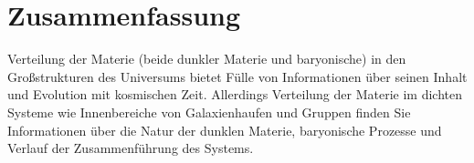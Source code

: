 {}

\chapter*{Zusammenfassung}%


Verteilung der Materie (beide dunkler Materie und baryonische) in den Großstrukturen
des Universums bietet Fülle von Informationen über seinen Inhalt und Evolution
mit kosmischen Zeit. Allerdings Verteilung der Materie im dichten Systeme wie Innenbereiche
von Galaxienhaufen und Gruppen finden Sie Informationen über die Natur der dunklen Materie,
baryonische Prozesse und Verlauf der Zusammenführung des Systems.



